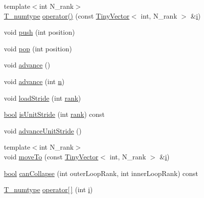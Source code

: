 \begin{DoxyCompactItemize}
\item 
{\footnotesize template$<$int N\+\_\+rank$>$ }\\\hyperlink{class__bz__ArrayExprUnaryOp_a89bf264c814e1fa55026c4389ad34085}{T\+\_\+numtype} \hyperlink{class__bz__ArrayExprUnaryOp_ad8cfadacbf2c6ea112b76f74ec70b6bb}{operator()} (const \hyperlink{classTinyVector}{Tiny\+Vector}$<$ int, N\+\_\+rank $>$ \&\hyperlink{indexexpr_8h_aabd77643995707c185e95c8cb2782c81}{i})
\item 
void \hyperlink{class__bz__ArrayExprUnaryOp_a83e122ca9dad97fa17bbf90324a4c71a}{push} (int position)
\item 
void \hyperlink{class__bz__ArrayExprUnaryOp_ac68b180972ee0dfeec2bb87afb4d5fdd}{pop} (int position)
\item 
void \hyperlink{class__bz__ArrayExprUnaryOp_af676d3a7cf0dfa7e7dc98dfc6f95f033}{advance} ()
\item 
void \hyperlink{class__bz__ArrayExprUnaryOp_a0576277e87b52f38d3dc18e92c04db74}{advance} (int \hyperlink{indexexpr_8h_ab427e2e2b4d6cec55fa088ea2a692ace}{n})
\item 
void \hyperlink{class__bz__ArrayExprUnaryOp_a22ba19764cd411a97cb34a7a5b6fbe6b}{load\+Stride} (int \hyperlink{class__bz__ArrayExprUnaryOp_aa736afcc97edc921e07290cb8c822555}{rank})
\item 
\hyperlink{compiler_8h_abb452686968e48b67397da5f97445f5b}{bool} \hyperlink{class__bz__ArrayExprUnaryOp_a2093dffb6e606661867c17ca8817b2ba}{is\+Unit\+Stride} (int \hyperlink{class__bz__ArrayExprUnaryOp_aa736afcc97edc921e07290cb8c822555}{rank}) const 
\item 
void \hyperlink{class__bz__ArrayExprUnaryOp_a07737fa3cafd808e854971038c468daa}{advance\+Unit\+Stride} ()
\item 
{\footnotesize template$<$int N\+\_\+rank$>$ }\\void \hyperlink{class__bz__ArrayExprUnaryOp_aaf14c09d69a4d2a399fdafff3c68f8ed}{move\+To} (const \hyperlink{classTinyVector}{Tiny\+Vector}$<$ int, N\+\_\+rank $>$ \&\hyperlink{indexexpr_8h_aabd77643995707c185e95c8cb2782c81}{i})
\item 
\hyperlink{compiler_8h_abb452686968e48b67397da5f97445f5b}{bool} \hyperlink{class__bz__ArrayExprUnaryOp_a0bf441447237c90d2d048452a1f747e4}{can\+Collapse} (int outer\+Loop\+Rank, int inner\+Loop\+Rank) const 
\item 
\hyperlink{class__bz__ArrayExprUnaryOp_a89bf264c814e1fa55026c4389ad34085}{T\+\_\+numtype} \hyperlink{class__bz__ArrayExprUnaryOp_a186e05f684794f59d13511e9fdd4c00d}{operator\mbox{[}$\,$\mbox{]}} (int \hyperlink{indexexpr_8h_aabd77643995707c185e95c8cb2782c81}{i})

\end{DoxyCompactItemize}
